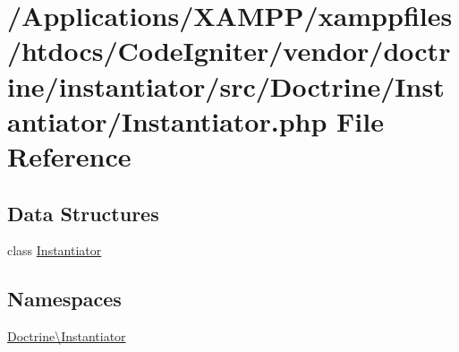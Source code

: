 \hypertarget{_instantiator_8php}{}\section{/\+Applications/\+X\+A\+M\+P\+P/xamppfiles/htdocs/\+Code\+Igniter/vendor/doctrine/instantiator/src/\+Doctrine/\+Instantiator/\+Instantiator.php File Reference}
\label{_instantiator_8php}
\subsection*{Data Structures}
\begin{DoxyCompactItemize}
\item 
class \mbox{\hyperlink{class_doctrine_1_1_instantiator_1_1_instantiator}{Instantiator}}
\end{DoxyCompactItemize}
\subsection*{Namespaces}
\begin{DoxyCompactItemize}
\item 
 \mbox{\hyperlink{namespace_doctrine_1_1_instantiator}{Doctrine\textbackslash{}\+Instantiator}}
\end{DoxyCompactItemize}
